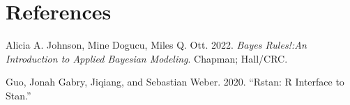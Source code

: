 \documentclass[
]{article}
\begin{document}
\hypertarget{references}{%
\section*{References}\label{references}}

\hypertarget{refs}{}
\leavevmode\hypertarget{ref-Alicia}{}%
Alicia A. Johnson, Mine Dogucu, Miles Q. Ott. 2022. \emph{Bayes
Rules!:An Introduction to Applied Bayesian Modeling}. Chapman; Hall/CRC.

\leavevmode\hypertarget{ref-rstan}{}%
Guo, Jonah Gabry, Jiqiang, and Sebastian Weber. 2020. ``Rstan: R
Interface to Stan.''
\end{document}
